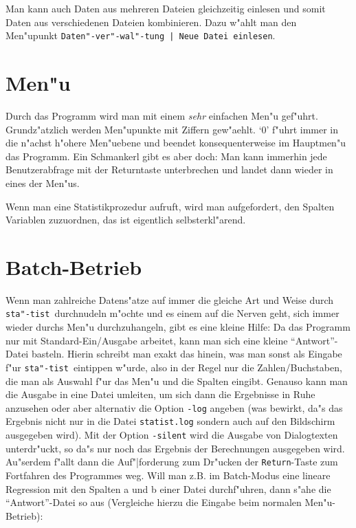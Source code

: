 \documentclass[a4paper,11pt]{article}
\newcommand{\st}{{\tt sta"-tist}}
\begin{document}
Man kann auch Daten aus mehreren Dateien gleichzeitig einlesen und
somit Daten aus verschiedenen Dateien kombinieren. Dazu w"ahlt man den
Men"upunkt {\tt Daten"-ver"-wal"-tung | Neue Datei einlesen}.



\section{Men"u}
\label{sec:menue}
Durch das Programm wird man mit einem {\em sehr\/} einfachen Men"u gef"uhrt.
Grundz"atzlich werden Men"upunkte mit Ziffern gew"aehlt. `0' f"uhrt
immer in die n"achst h"ohere Men"uebene und beendet konsequenterweise
im Hauptmen"u das Programm. Ein Schmankerl gibt es aber doch: Man kann
immerhin jede Benutzerabfrage mit der Returntaste unterbrechen und
landet dann wieder in eines der Men"us.

Wenn man eine Statistikprozedur aufruft, wird man aufgefordert, den
Spalten Variablen zuzuordnen, das ist eigentlich selbsterkl"arend.



\section{Batch-Betrieb}
\label{sec:batch}

Wenn man zahlreiche Datens"atze auf immer die gleiche Art und Weise
durch \st\ durchnudeln m"ochte und es einem auf die Nerven geht, sich
immer wieder durchs Men"u durchzuhangeln, gibt es eine kleine Hilfe:
Da das Programm nur mit Standard-Ein/Ausgabe arbeitet, kann man sich
eine kleine "`Antwort"'-Datei basteln. Hierin schreibt man exakt das
hinein, was man sonst als Eingabe f"ur \st\ eintippen w"urde, also in
der Regel nur die Zahlen/Buchstaben, die man als Auswahl f"ur das
Men"u und die Spalten eingibt.  Genauso kann man die Ausgabe in eine
Datei umleiten, um sich dann die Ergebnisse in Ruhe anzusehen oder
aber alternativ die Option {\tt -log} angeben (was bewirkt, da"s das
Ergebnis nicht nur in die Datei {\tt statist.log} sondern auch auf den
Bildschirm ausgegeben wird). Mit der Option {\tt -silent} wird die
Ausgabe von Dialogtexten unterdr"uckt, so da"s nur noch das Ergebnis
der Berechnungen ausgegeben wird. Au"serdem f"allt dann die
Auf"|forderung zum Dr"ucken der {\tt Return}-Taste zum Fortfahren des
Programmes weg. Will man z.B. im Batch-Modus eine lineare Regression
mit den Spalten a und b einer Datei durchf"uhren, dann s"ahe die
"`Antwort"'-Datei so aus (Vergleiche hierzu die Eingabe beim normalen
Men"u-Betrieb):
\end{document}
